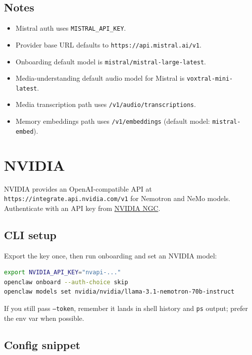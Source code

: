 \subsection{Notes}


\begin{itemize}
  \item Mistral auth uses \texttt{MISTRAL\_API\_KEY}.
  \item Provider base URL defaults to \texttt{https://api.mistral.ai/v1}.
  \item Onboarding default model is \texttt{mistral/mistral-large-latest}.
  \item Media-understanding default audio model for Mistral is \texttt{voxtral-mini-latest}.
  \item Media transcription path uses \texttt{/v1/audio/transcriptions}.
  \item Memory embeddings path uses \texttt{/v1/embeddings} (default model: \texttt{mistral-embed}).
\end{itemize}



\clearpage

\section{NVIDIA}


NVIDIA provides an OpenAI-compatible API at \texttt{https://integrate.api.nvidia.com/v1} for Nemotron and NeMo models. Authenticate with an API key from \href{https://catalog.ngc.nvidia.com/}{NVIDIA NGC}.

\subsection{CLI setup}


Export the key once, then run onboarding and set an NVIDIA model:

\begin{lstlisting}[language=bash]
export NVIDIA_API_KEY="nvapi-..."
openclaw onboard --auth-choice skip
openclaw models set nvidia/nvidia/llama-3.1-nemotron-70b-instruct
\end{lstlisting}


If you still pass \texttt{--token}, remember it lands in shell history and \texttt{ps} output; prefer the env var when possible.

\subsection{Config snippet}


